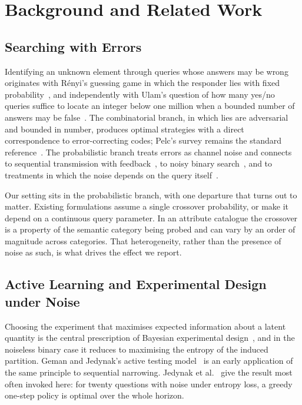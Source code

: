 \section{Background and Related Work}
\label{sec:related}

\subsection{Searching with Errors}

Identifying an unknown element through queries whose answers may be wrong
originates with R\'enyi's guessing game in which the responder lies with fixed
probability~\cite{renyi1961}, and independently with Ulam's question of how
many yes/no queries suffice to locate an integer below one million when a
bounded number of answers may be false~\cite{ulam1976}. The combinatorial
branch, in which lies are adversarial and bounded in number, produces optimal
strategies with a direct correspondence to error-correcting codes; Pelc's
survey remains the standard reference~\cite{pelc2002}. The probabilistic
branch treats errors as channel noise and connects to sequential transmission
with feedback~\cite{horstein1963,burnashev1974}, to noisy binary
search~\cite{karp2007,nowak2011}, and to treatments in which the noise depends
on the query itself~\cite{kaspi2018,chung2018}.

Our setting sits in the probabilistic branch, with one departure that turns
out to matter. Existing formulations assume a single crossover probability, or
make it depend on a continuous query parameter. In an attribute catalogue the
crossover is a property of the semantic category being probed and can vary by
an order of magnitude across categories. That heterogeneity, rather than the
presence of noise as such, is what drives the effect we report.

\subsection{Active Learning and Experimental Design under Noise}

Choosing the experiment that maximises expected information about a latent
quantity is the central prescription of Bayesian experimental
design~\cite{lindley1956,chaloner1995}, and in the noiseless binary case it
reduces to maximising the entropy of the induced partition. Geman and
Jedynak's active testing model~\cite{geman1996active} is an early application
of the same principle to sequential narrowing. Jedynak et
al.~\cite{jedynak2012} give the result most often invoked here: for twenty
questions with noise under entropy loss, a greedy one-step policy is optimal
over the whole horizon.


